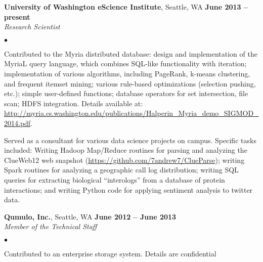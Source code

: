 \documentclass[margin,line]{res}
\newenvironment{list2}{
  \begin{list}{$\bullet$}{%
      \setlength{\itemsep}{0in}
      \setlength{\parsep}{0in} \setlength{\parskip}{0in}
      \setlength{\topsep}{0in} \setlength{\partopsep}{0in} 
      \setlength{\leftmargin}{0.2in}}}{\end{list}}
\begin{document}
\begin{resume}
\textbf{University of Washington eScience Institute}, Seattle, WA \hfill \textbf{June 2013 -- present} \\\vspace{-4mm}
\textsl{Research Scientist} \\
\begin{list2}
\item Contributed to the Myria distributed database: design and implementation of the MyriaL query language, which combines SQL-like functionality with iteration; implementation of various algorithms, including PageRank, k-means clustering, and frequent itemset mining; various rule-based optimizations (selection pushing, etc.); simple user-defined functions; database operators for set intersection, file scan; HDFS integration.  Details available at:\\
\url{http://myria.cs.washington.edu/publications/Halperin_Myria_demo_SIGMOD_2014.pdf}.

\item Served as a consultant for various data science projects on campus.  Specific tasks included: Writing Hadoop Map/Reduce routines for parsing and analyzing the ClueWeb12 web snapshot (\url{https://github.com/7andrew7/ClueParse}); writing Spark routines for analyzing a geographic call log distribution; writing SQL queries for extracting biological ``interologs'' from a database of protein interactions; and writing Python code for applying sentiment analysis to twitter data.
\end{list2}

\textbf{Qumulo, Inc.}, Seattle, WA \hfill \textbf{June 2012 -- June 2013} \\\vspace{-4mm}
\textsl{Member of the Technical Staff}  \\
\begin{list2}
  \item Contributed to an enterprise storage system.  Details are confidential
  \end{list2}


\end{resume}
\end{document}
